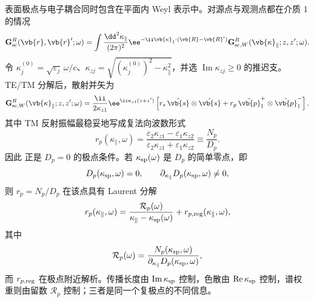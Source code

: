 表面极点与电子耦合同时包含在平面内 Weyl 表示中。对源点与观测点都在介质 1 的情况
\begin{equation}
\mathbf G_{\rm sc}^R(\vb{r},\vb{r}';\omega)
=\int\frac{\dd^2 \kappa_\parallel}{(2\pi)^2}
 \ee^{-\ii\vb{\kappa}_\parallel\cdot(\vb{R}-\vb{R}')}
\mathbf G_{{\rm sc},W}^R(\vb{\kappa}_\parallel;z,z';\omega).
\label{eq:planar_green_weyl_definition}
\end{equation}
令 $\kappa_j^{(0)}=\sqrt{\varepsilon_j}\,\omega/c$、$\kappa_{zj}=\sqrt{(\kappa_j^{(0)})^2-\kappa_\parallel^2}$，并选 $\operatorname{Im}\kappa_{zj}\ge0$ 的推迟支。TE/TM 分解后，散射并矢为
\begin{equation}
{
\mathbf G_{{\rm sc},W}^R
(\vb{\kappa}_\parallel;z,z';\omega)
=\frac{\ii}{2\kappa_{z1}}\ee^{\ii\kappa_{z1}(z+z')}
\left[r_s\,\hat{\vb{s}}\otimes\hat{\vb{s}}
+r_p\,\hat{\vb{p}}_1^+\otimes\hat{\vb{p}}_1^-\right].}
\label{eq:planar_scattering_green_dyadic}
\end{equation}
其中 TM 反射振幅最稳妥地写成复法向波数形式
\begin{equation}
r_p(\kappa_\parallel,\omega)
=\frac{\varepsilon_2\kappa_{z1}-\varepsilon_1\kappa_{z2}}
{\varepsilon_2\kappa_{z1}+\varepsilon_1\kappa_{z2}}
\equiv\frac{N_p}{D_p}.
\label{eq:rp_complex_kz_form}
\end{equation}
因此 正是 $D_p=0$ 的极点条件。若 $\kappa_{\rm sp}(\omega)$ 是 $D_p$ 的简单零点，即
\begin{equation*}
 D_p(\kappa_{\rm sp},\omega)=0,
 \qquad
 \partial_{\kappa_\parallel}D_p(\kappa_{\rm sp},\omega)\neq0,
\end{equation*}
则 $r_p=N_p/D_p$ 在该点具有 Laurent 分解
\begin{equation*}
 r_p(\kappa_\parallel,\omega)
 =\frac{\mathcal R_p(\omega)}
 {\kappa_\parallel-\kappa_{\rm sp}(\omega)}
 +r_{p,{\rm reg}}(\kappa_\parallel,\omega),
\end{equation*}
其中
\begin{equation*}
 \mathcal R_p(\omega)
 =\frac{N_p(\kappa_{\rm sp},\omega)}
 {\partial_{\kappa_\parallel}D_p(\kappa_{\rm sp},\omega)},
\end{equation*}
而 $r_{p,{\rm reg}}$ 在极点附近解析。传播长度由 $\operatorname{Im}\kappa_{\rm sp}$ 控制，色散由 $\operatorname{Re}\kappa_{\rm sp}$ 控制，谱权重则由留数 $\mathcal R_p$ 控制；三者是同一个复极点的不同信息。

